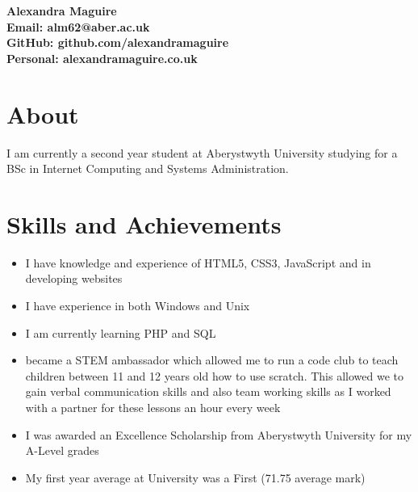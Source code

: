 \documentclass[a4paper,10pt]{article}
\begin{document}
\begin{center}
\bf{\Huge{Alexandra Maguire}} \\[0.5cm]
\large Email: alm62@aber.ac.uk \\
\large GitHub: github.com/alexandramaguire \\
\large Personal: alexandramaguire.co.uk \\[0.5cm]
\end{center}
\vspace{20pt}
\section*{About}
I am currently a second year student at Aberystwyth University studying for a BSc in Internet Computing and Systems Administration.
\section*{Skills and Achievements}
\begin{itemize}
    \item I have knowledge and experience of HTML5, CSS3, JavaScript and in developing websites
    \item I have experience in both Windows and Unix
    \item I am currently learning PHP and SQL
    \item  became a STEM ambassador which allowed me to run a code club to teach children between 11 and 12 years old how to use scratch. This allowed we to gain verbal communication skills and also team working skills as I worked with a partner for these lessons an hour every week
     \item I was awarded an Excellence Scholarship from Aberystwyth University for my A-Level grades
     \item My first year average at University was a First (71.75 average mark)
\end{itemize}
\end{document}
